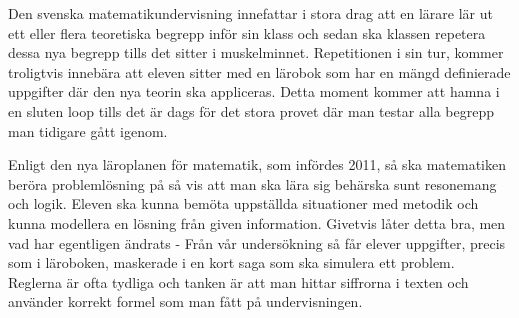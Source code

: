 \textcolor{WildStrawberry}{
    Den svenska matematikundervisning innefattar i stora drag att en lärare lär ut ett eller flera teoretiska begrepp inför sin klass och sedan ska klassen repetera dessa nya begrepp tills det sitter i muskelminnet. Repetitionen i sin tur, kommer troligtvis innebära att eleven sitter med en lärobok som har en mängd definierade uppgifter där den nya teorin ska appliceras. Detta moment kommer att hamna i en sluten loop tills det är dags för det stora provet där man testar alla begrepp man tidigare gått igenom.
}






\textcolor{WildStrawberry}{
    Enligt den nya läroplanen för matematik, som infördes 2011, så ska matematiken beröra problemlösning på så vis att man ska lära sig behärska sunt resonemang och logik. Eleven ska kunna bemöta uppställda situationer med metodik och kunna modellera en lösning från given information. Givetvis låter detta bra, men vad har egentligen ändrats - Från vår undersökning så får elever uppgifter, precis som i läroboken, maskerade i en kort saga som ska simulera ett problem. Reglerna är ofta tydliga och tanken är att man hittar siffrorna i texten och använder korrekt formel som man fått på undervisningen. 
}

